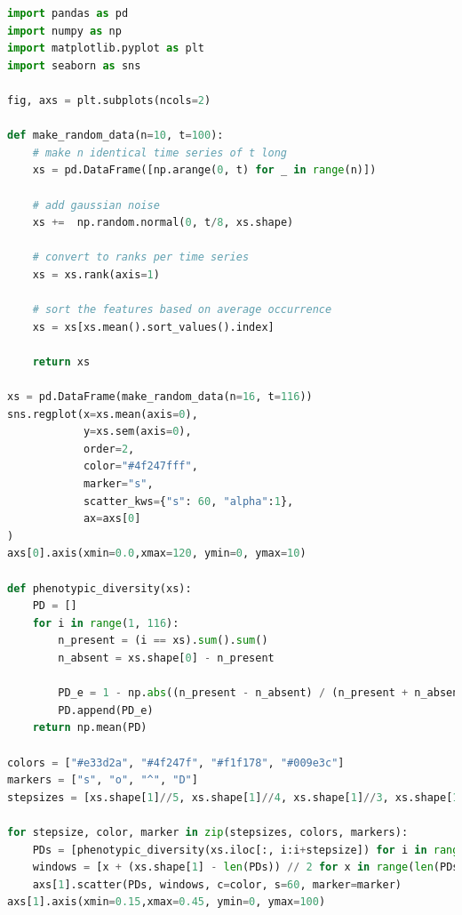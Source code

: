 \begin{lstlisting}[language=Python]
import pandas as pd
import numpy as np
import matplotlib.pyplot as plt
import seaborn as sns

fig, axs = plt.subplots(ncols=2)

def make_random_data(n=10, t=100):
    # make n identical time series of t long
    xs = pd.DataFrame([np.arange(0, t) for _ in range(n)])
    
    # add gaussian noise
    xs +=  np.random.normal(0, t/8, xs.shape) 
    
    # convert to ranks per time series
    xs = xs.rank(axis=1)
    
    # sort the features based on average occurrence
    xs = xs[xs.mean().sort_values().index]
    
    return xs

xs = pd.DataFrame(make_random_data(n=16, t=116))
sns.regplot(x=xs.mean(axis=0), 
            y=xs.sem(axis=0),
            order=2,
            color="#4f247fff", 
            marker="s",
            scatter_kws={"s": 60, "alpha":1},
            ax=axs[0]
)
axs[0].axis(xmin=0.0,xmax=120, ymin=0, ymax=10)

def phenotypic_diversity(xs):
    PD = []
    for i in range(1, 116):
        n_present = (i == xs).sum().sum()
        n_absent = xs.shape[0] - n_present

        PD_e = 1 - np.abs((n_present - n_absent) / (n_present + n_absent))
        PD.append(PD_e)
    return np.mean(PD)

colors = ["#e33d2a", "#4f247f", "#f1f178", "#009e3c"]
markers = ["s", "o", "^", "D"]
stepsizes = [xs.shape[1]//5, xs.shape[1]//4, xs.shape[1]//3, xs.shape[1]//2]

for stepsize, color, marker in zip(stepsizes, colors, markers):
    PDs = [phenotypic_diversity(xs.iloc[:, i:i+stepsize]) for i in range(0, xs.shape[1] - stepsize)]
    windows = [x + (xs.shape[1] - len(PDs)) // 2 for x in range(len(PDs))]
    axs[1].scatter(PDs, windows, c=color, s=60, marker=marker)
axs[1].axis(xmin=0.15,xmax=0.45, ymin=0, ymax=100)
\end{lstlisting}

